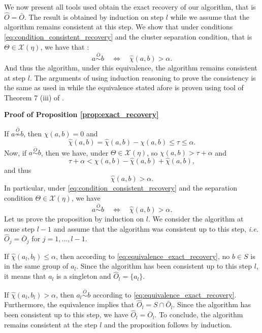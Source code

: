 \documentclass[11pt]{article}
\makeatletter
\renewenvironment{proof}[1][\proofname]{\par
\pushQED{\qed}%
\normalfont \topsep6\p@\@plus6\p@\relax
\trivlist
\item\relax
{\textbf{
#1\@addpunct{ }}}\hspace\labelsep\ignorespaces
}{%
\popQED\endtrivlist\@endpefalse
}
\makeatother
\begin{document}
	We now present all tools used obtain the exact recovery of our algorithm, that is $\hat{O} = \bar{O}$. The result is obtained by induction on step $l$ while we assume that the algorithm remains consistent at this step. We show that under conditions \eqref{eq:condition_consistent_recovery} and the cluster separation condition, that is $\Theta \in \mathcal{X}(\eta)$, we have that :
	\begin{equation*}
		a \overset{\bar{O}}{ \sim } b \quad \Longleftrightarrow \quad \hat{\chi}(a, b) > \alpha.
	\end{equation*}
	And thus the algorithm, under this equivalence, the algorithm remains consistent at step $l$. The arguments of using induction reasoning to prove the consistency is the same as used in \cite{10.1214/18-AOS1794} while the equivalence stated afore is proven using tool of Theorem 7 (iii) of \cite{tsybakov2014aggregation}.
	
	\begin{proof}[Proof of Proposition \ref{prop:exact_recovery}]
		If $a \overset{\bar{O}}{\not \sim} b$, then $\chi(a,b) = 0$ and 
		\begin{equation*}
			\hat{\chi}(a,b) = \hat{\chi}(a,b) - \chi(a,b) \leq \tau \leq \alpha.
		\end{equation*}
		Now, if $a \overset{\bar{O}}{\sim} b$, then we have, under $\Theta \in \mathcal{X}(\eta)$, so $\chi(a,b) > \tau + \alpha$ and 
		\begin{equation*}
			\tau + \alpha < \chi(a,b) - \hat{\chi}(a,b) + \hat{\chi}(a,b),
		\end{equation*}
		and thus
		\begin{equation*}
			\hat{\chi}(a,b) > \alpha.
		\end{equation*}
		In particular, under \eqref{eq:condition_consistent_recovery} and the separation condition $\Theta \in \mathcal{X}(\eta)$, we have 
		\begin{equation}
			\label{eq:equivalence_exact_recovery}
		a \overset{\bar{O}}{ \sim } b \quad \Longleftrightarrow \quad \hat{\chi}(a, b) > \alpha.
		\end{equation}
		Let us prove the proposition by induction on $l$. We consider the algorithm at some step $l-1$ and assume that the algorithm was consistent up to this step, \emph{i.e.} $\hat{O}_j = \bar{O}_j$ for $j = 1,\dots,l-1$.
		
		If $\hat{\chi}(a_l,b_l) \leq \alpha$, then according to \eqref{eq:equivalence_exact_recovery}, no $b \in S$ is in the same group of $a_l$. Since the algorithm has been consistent up to this step $l$, it means that $a_l$ is a singleton and $\hat{O}_l = \{a_l\}$.
		
		If $\hat{\chi}(a_l,b_l) > \alpha$, then $a_l \overset{\bar{O}}{\sim} b$ according to \eqref{eq:equivalence_exact_recovery}. Furthermore, the equivalence implies that $\hat{O}_l = S \cap \bar{O}_l$. Since the algorithm has been consistent up to this step, we have $\hat{O}_l = \bar{O}_l$. To conclude, the algorithm remains consistent at the step $l$ and the proposition follows by induction.
		
	\end{proof}
	
\end{document}
